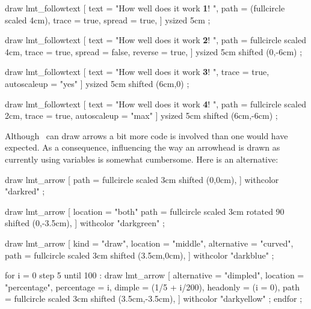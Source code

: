 \startbuffer
{}
    draw lmt_followtext [
        text    = "How well does it work {\bf 1}! ",
        path    = (fullcircle scaled 4cm),
        trace   = true,
        spread  = true,
    ] ysized 5cm ;

    draw lmt_followtext [
        text    = "How well does it work {\bf 2}! ",
        path    = fullcircle scaled 4cm,
        trace   = true,
        spread  = false,
        reverse = true,
    ] ysized 5cm shifted (0,-6cm) ;

    draw lmt_followtext [
        text        = "How well does it work {\bf 3}! ",
        trace       = true,
        autoscaleup = "yes"
    ] ysized 5cm shifted (6cm,0) ;

    draw lmt_followtext [
        text        = "How well does it work {\bf 4}! ",
        path        = fullcircle scaled 2cm,
        trace       = true,
        autoscaleup = "max"
    ] ysized 5cm shifted (6cm,-6cm) ;
\stopMPcode
\stopbuffer

\typebuffer[option=TEX]

\startlinecorrection
\getbuffer
\stoplinecorrection

Although \METAPOST\ can draw arrows a bit more code is involved than one would
have expected. As a consequence, influencing the way an arrowhead is drawn as
currently using variables is somewhat cumbersome. Here is an alternative:

\startbuffer
{}
    draw lmt_arrow [
        path = fullcircle
            scaled  3cm
            shifted (0,0cm),
    ] withcolor "darkred" ;

    draw lmt_arrow [
        location = "both"
        path     = fullcircle
            scaled  3cm
            rotated 90
            shifted (0,-3.5cm),
    ] withcolor "darkgreen" ;

    draw lmt_arrow [
        kind        = "draw",
        location    = "middle",
        alternative = "curved",
        path        = fullcircle
            scaled  3cm
            shifted (3.5cm,0cm),
    ] withcolor "darkblue" ;

    for i = 0 step 5 until 100 :
        draw lmt_arrow [
            alternative = "dimpled",
            location    = "percentage",
            percentage  = i,
            dimple      = (1/5 + i/200),
            headonly    = (i = 0),
            path        = fullcircle
                scaled  3cm
                shifted (3.5cm,-3.5cm),
        ] withcolor "darkyellow" ;
    endfor ;
\stopMPcode
\stopbuffer

